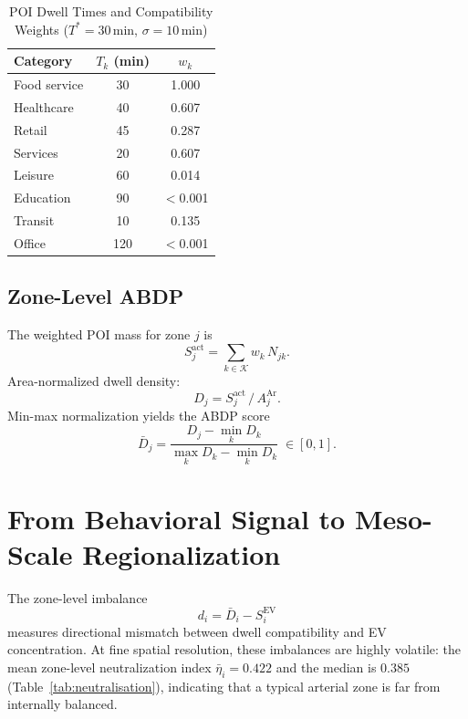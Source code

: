 \documentclass[conference]{IEEEtran}
\begin{document}
\begin{table}[t]
\centering
\caption{POI Dwell Times and Compatibility Weights ($T^*=30$\,min,
         $\sigma=10$\,min)}
\label{tab:dwell_weights}
\small
\begin{tabular}{lcc}
\toprule
Category & $T_k$ (min) & $w_k$ \\
\midrule
Food service & 30 & 1.000 \\
Healthcare   & 40 & 0.607 \\
Retail       & 45 & 0.287 \\
Services     & 20 & 0.607 \\
Leisure      & 60 & 0.014 \\
Education    & 90 & $<$0.001 \\
Transit      & 10 & 0.135 \\
Office       & 120 & $<$0.001 \\
\bottomrule
\end{tabular}
\end{table}

\subsection{Zone-Level ABDP}
The weighted POI mass for zone $j$ is
\begin{equation}
S^{\mathrm{act}}_j = \sum_{k\in\mathcal{K}} w_k\, N_{jk}.
\end{equation}
Area-normalized dwell density:
\begin{equation}
D_j = S^{\mathrm{act}}_j \,/\, A^{\mathrm{Ar}}_j.
\end{equation}
Min-max normalization yields the ABDP score
\begin{equation}
\bar{D}_j =
\frac{D_j - \min_k D_k}{\max_k D_k - \min_k D_k}
\;\in[0,1].
\end{equation}

\section{From Behavioral Signal to Meso-Scale Regionalization}

The zone-level imbalance
\begin{equation}
d_i = \bar{D}_i - S_i^{\mathrm{EV}}
\end{equation}
measures directional mismatch between dwell compatibility and EV
concentration.
At fine spatial resolution, these imbalances are highly volatile:
the mean zone-level neutralization index
$\bar{\eta}_i = 0.422$ and the median is $0.385$
(Table~\ref{tab:neutralisation}), indicating that a typical arterial
zone is far from internally balanced.
\end{document}
